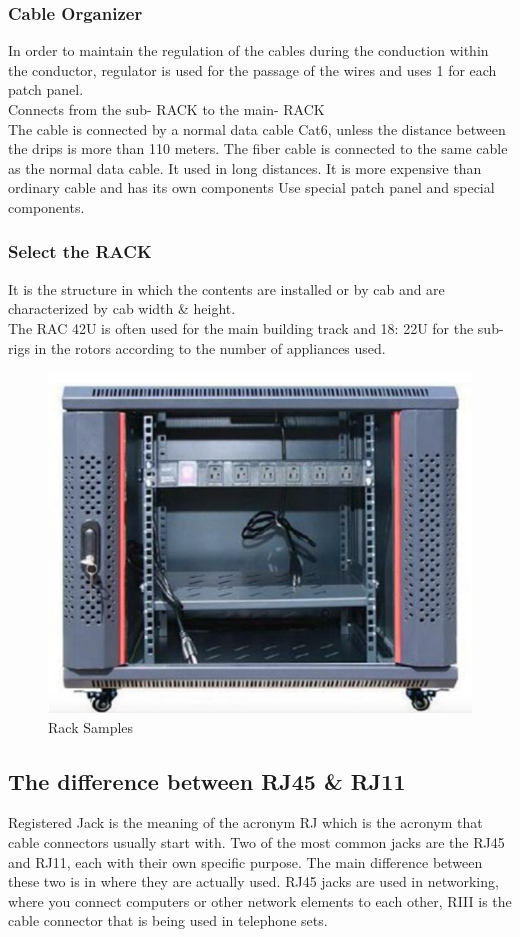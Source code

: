 \documentclass[12pt,fleqn]{book} %
\begin{document}
\subsubsection{Cable Organizer}
In order to maintain the regulation of the cables during the conduction within the conductor, regulator is used for the passage of the wires and uses 1 for each patch panel.
\\ Connects from the sub- RACK to the main- RACK
\\ The cable is connected by a normal data cable Cat6, unless the distance between the drips is more than 110 meters. The fiber cable is connected to the same cable as the normal data cable. It used in long distances. It is more expensive than ordinary cable and has its own components Use special patch panel and special components.
\subsubsection{Select the RACK}
It is the structure in which the contents are installed or by cab and are characterized by cab width \& height.
\\ The RAC 42U is often used for the main building track and 18: 22U for the sub-rigs in the rotors according to the number of appliances used.
\begin{figure}[!h]
    \centering
    \includegraphics[width=0.5\linewidth]{hamdy 61.png}
    \caption{Rack Samples}
    \label{fig:hamdy 61}
    \end{figure}
\subsection{The difference between RJ45 & RJ11}
Registered Jack is the meaning of the acronym RJ which is the acronym that cable connectors usually start with. Two of the most common jacks are the RJ45 and RJ11, each with their own specific purpose. The main difference between these two is in where they are actually used. RJ45 jacks are used in networking, where you connect computers or other network elements to each other, RIII is the cable connector that is being used in telephone sets.
\end{document}
